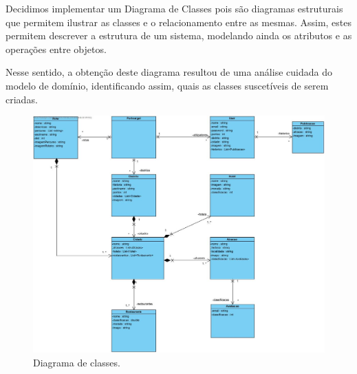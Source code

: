 Decidimos implementar um Diagrama de Classes pois são diagramas estruturais que permitem ilustrar as classes e o relacionamento entre as mesmas. Assim, estes permitem descrever a estrutura de um sistema, modelando ainda os atributos e as operações entre objetos. \par Nesse sentido, a obtenção deste diagrama resultou de uma análise cuidada do modelo de domínio, identificando assim, quais as classes suscetíveis de serem criadas.

\begin{figure}[H]
\centering
\includegraphics[width=0.9\linewidth]{images/diagrama_classe.jpg}
\caption{Diagrama de classes.}
\end{figure}